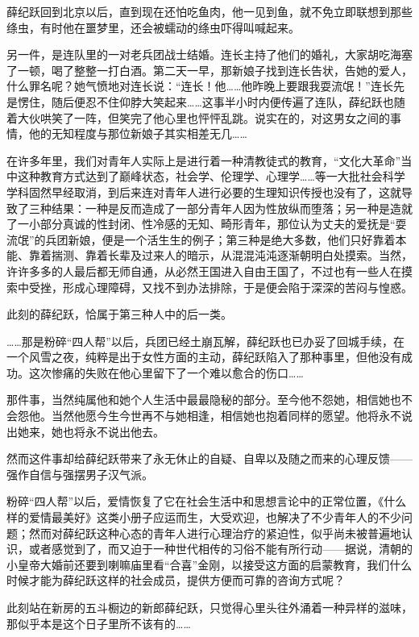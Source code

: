 \par 薛纪跃回到北京以后，直到现在还怕吃鱼肉，他一见到鱼，就不免立即联想到那些绦虫，有时他在噩梦里，还会被蠕动的绦虫吓得叫喊起来。
\par 另一件，是连队里的一对老兵团战士结婚。连长主持了他们的婚礼，大家胡吃海塞了一顿，喝了整整一打白酒。第二天一早，那新娘子找到连长告状，告她的爱人，什么罪名呢？她气愤地对连长说：“连长！他……他昨晚上要跟我耍流氓！”连长先是愣住，随后便忍不住仰脖大笑起来……这事半小时内便传遍了连队，薛纪跃也随着大伙哄笑了一阵，但笑完了他心里也怦怦乱跳。说实在的，对这男女之间的事情，他的无知程度与那位新娘子其实相差无几……
\par 在许多年里，我们对青年人实际上是进行着一种清教徒式的教育，“文化大革命”当中这种教育方式达到了巅峰状态，社会学、伦理学、心理学……等一大批社会科学学科固然早经取消，到后来连对青年人进行必要的生理知识传授也没有了，这就导致了三种结果：一种是反而造成了一部分青年人因为性放纵而堕落；另一种是造就了一小部分真诚的性封闭、性冷感的无知、畸形青年，那位认为丈夫的爱抚是“耍流氓”的兵团新娘，便是一个活生生的例子；第三种是绝大多数，他们只好靠着本能、靠着揣测、靠着长辈及过来人的暗示，从混混沌沌逐渐朝明白处摸索。当然，许许多多的人最后都无师自通，从必然王国进入自由王国了，不过也有一些人在摸索中受挫，形成心理障碍，又找不到办法排除，于是便会陷于深深的苦闷与惶惑。
\par 此刻的薛纪跃，恰属于第三种人中的后一类。
\par ……那是粉碎“四人帮”以后，兵团已经土崩瓦解，薛纪跃也已办妥了回城手续，在一个风雪之夜，纯粹是出于女性方面的主动，薛纪跃陷入了那种事里，但他没有成功。这次惨痛的失败在他心里留下了一个难以愈合的伤口……
\par 那件事，当然纯属他和她个人生活中最最隐秘的部分。至今他不怨她，相信她也不会怨他。当然他愿今生今世再不与她相逢，相信她也抱着同样的愿望。他将永不说出她来，她也将永不说出他去。
\par 然而这件事却给薛纪跃带来了永无休止的自疑、自卑以及随之而来的心理反馈——强作自信与强摆男子汉气派。
\par 粉碎“四人帮”以后，爱情恢复了它在社会生活中和思想言论中的正常位置，《什么样的爱情最美好》这类小册子应运而生，大受欢迎，也解决了不少青年人的不少问题；然而对薛纪跃这种心态的青年人进行心理治疗的紧迫性，似乎尚未被普遍地认识，或者感觉到了，而又迫于一种世代相传的习俗不能有所行动——据说，清朝的小皇帝大婚前还要到喇嘛庙里看“合喜”金刚，以接受这方面的启蒙教育，我们什么时候才能为薛纪跃这样的社会成员，提供方便而可靠的咨询方式呢？
\par 此刻站在新房的五斗橱边的新郎薛纪跃，只觉得心里头往外涌着一种异样的滋味，那似乎本是这个日子里所不该有的……
